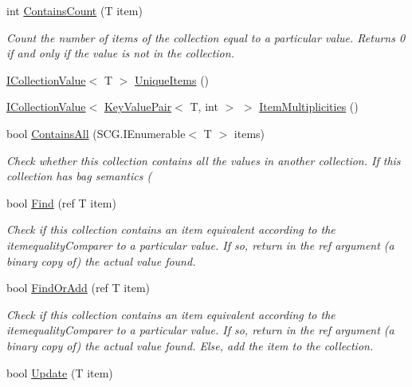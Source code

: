 \begin{DoxyCompactItemize}
int \hyperlink{interface_c5_1_1_i_collection_acfe7e2c9b14c384762269edbb57b7fbe}{Contains\+Count} (T item)
\begin{DoxyCompactList}\small\item\em Count the number of items of the collection equal to a particular value. Returns 0 if and only if the value is not in the collection. \end{DoxyCompactList}\item 
\hyperlink{interface_c5_1_1_i_collection_value}{I\+Collection\+Value}$<$ T $>$ \hyperlink{interface_c5_1_1_i_collection_a074c4e1a90fb7f98c95834204352c28c}{Unique\+Items} ()
\item 
\hyperlink{interface_c5_1_1_i_collection_value}{I\+Collection\+Value}$<$ \hyperlink{struct_c5_1_1_key_value_pair}{Key\+Value\+Pair}$<$ T, int $>$ $>$ \hyperlink{interface_c5_1_1_i_collection_a623bd834b37b299c5f4948fdb6915fef}{Item\+Multiplicities} ()
\item 
bool \hyperlink{interface_c5_1_1_i_collection_a93abf02183a46f56af8d90f1d69982a8}{Contains\+All} (S\+C\+G.\+I\+Enumerable$<$ T $>$ items)
\begin{DoxyCompactList}\small\item\em Check whether this collection contains all the values in another collection. If this collection has bag semantics ( \end{DoxyCompactList}\item 
bool \hyperlink{interface_c5_1_1_i_collection_a96fd6cfd3df62e67922f9335b0fbbdcb}{Find} (ref T item)
\begin{DoxyCompactList}\small\item\em Check if this collection contains an item equivalent according to the itemequality\+Comparer to a particular value. If so, return in the ref argument (a binary copy of) the actual value found. \end{DoxyCompactList}\item 
bool \hyperlink{interface_c5_1_1_i_collection_a7f9e609ee1a7607596bb65aa5bdff303}{Find\+Or\+Add} (ref T item)
\begin{DoxyCompactList}\small\item\em Check if this collection contains an item equivalent according to the itemequality\+Comparer to a particular value. If so, return in the ref argument (a binary copy of) the actual value found. Else, add the item to the collection. \end{DoxyCompactList}\item 
bool \hyperlink{interface_c5_1_1_i_collection_acf060ba6b83289dc74bea61502318d56}{Update} (T item)

\end{DoxyCompactItemize}
